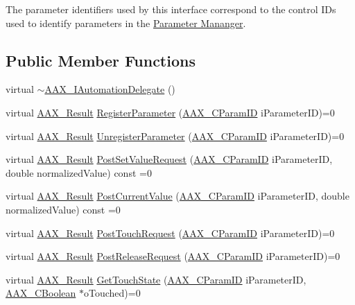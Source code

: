 The parameter identifiers used by this interface correspond to the control I\+Ds used to identify parameters in the \hyperlink{a00034}{Parameter Mananger}. \subsection*{Public Member Functions}
\begin{DoxyCompactItemize}
\item 
virtual \hyperlink{a00086_a566c6c261d00207024a07990c86f9694}{$\sim$\+A\+A\+X\+\_\+\+I\+Automation\+Delegate} ()
\item 
virtual \hyperlink{a00149_a4d8f69a697df7f70c3a8e9b8ee130d2f}{A\+A\+X\+\_\+\+Result} \hyperlink{a00086_a4d91efb2d922729d02e2ea7d7a05ed10}{Register\+Parameter} (\hyperlink{a00149_a1440c756fe5cb158b78193b2fc1780d1}{A\+A\+X\+\_\+\+C\+Param\+I\+D} i\+Parameter\+I\+D)=0
\item 
virtual \hyperlink{a00149_a4d8f69a697df7f70c3a8e9b8ee130d2f}{A\+A\+X\+\_\+\+Result} \hyperlink{a00086_ab1c1d4292460119b22d68247150cc1a0}{Unregister\+Parameter} (\hyperlink{a00149_a1440c756fe5cb158b78193b2fc1780d1}{A\+A\+X\+\_\+\+C\+Param\+I\+D} i\+Parameter\+I\+D)=0
\item 
virtual \hyperlink{a00149_a4d8f69a697df7f70c3a8e9b8ee130d2f}{A\+A\+X\+\_\+\+Result} \hyperlink{a00086_a9d0e2c5d57d177a4dca0ff10cde0256c}{Post\+Set\+Value\+Request} (\hyperlink{a00149_a1440c756fe5cb158b78193b2fc1780d1}{A\+A\+X\+\_\+\+C\+Param\+I\+D} i\+Parameter\+I\+D, double normalized\+Value) const =0
\item 
virtual \hyperlink{a00149_a4d8f69a697df7f70c3a8e9b8ee130d2f}{A\+A\+X\+\_\+\+Result} \hyperlink{a00086_a20cb518bb470b6f4cadf58e4af64ac96}{Post\+Current\+Value} (\hyperlink{a00149_a1440c756fe5cb158b78193b2fc1780d1}{A\+A\+X\+\_\+\+C\+Param\+I\+D} i\+Parameter\+I\+D, double normalized\+Value) const =0
\item 
virtual \hyperlink{a00149_a4d8f69a697df7f70c3a8e9b8ee130d2f}{A\+A\+X\+\_\+\+Result} \hyperlink{a00086_a30fdb67042b8dc9fb42fa9023ed9cce0}{Post\+Touch\+Request} (\hyperlink{a00149_a1440c756fe5cb158b78193b2fc1780d1}{A\+A\+X\+\_\+\+C\+Param\+I\+D} i\+Parameter\+I\+D)=0
\item 
virtual \hyperlink{a00149_a4d8f69a697df7f70c3a8e9b8ee130d2f}{A\+A\+X\+\_\+\+Result} \hyperlink{a00086_a89049fae2c35a4b99cfeb6585898bb69}{Post\+Release\+Request} (\hyperlink{a00149_a1440c756fe5cb158b78193b2fc1780d1}{A\+A\+X\+\_\+\+C\+Param\+I\+D} i\+Parameter\+I\+D)=0
\item 
virtual \hyperlink{a00149_a4d8f69a697df7f70c3a8e9b8ee130d2f}{A\+A\+X\+\_\+\+Result} \hyperlink{a00086_a4436f06c72d61217cbbfc7c233501f29}{Get\+Touch\+State} (\hyperlink{a00149_a1440c756fe5cb158b78193b2fc1780d1}{A\+A\+X\+\_\+\+C\+Param\+I\+D} i\+Parameter\+I\+D, \hyperlink{a00149_aa216506530f1d19a2965931ced2b274b}{A\+A\+X\+\_\+\+C\+Boolean} $\ast$o\+Touched)=0
\end{DoxyCompactItemize}


